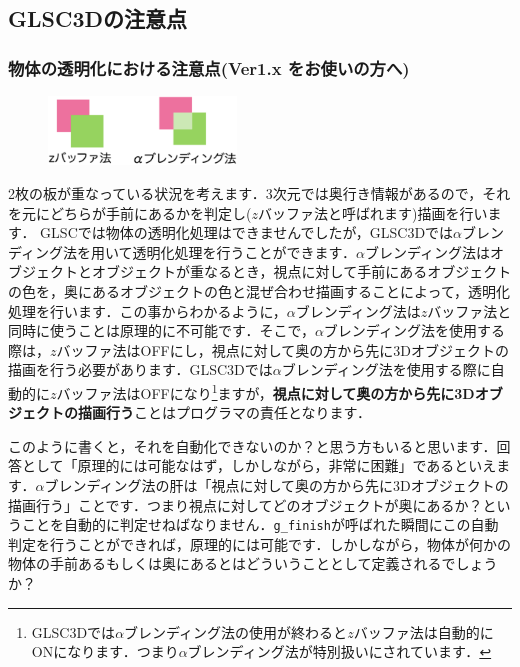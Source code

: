 \documentclass[platex,a4paper,12pt]{jsarticle}%
\begin{document}
\newpage
\subsection{GLSC3Dの注意点}

\subsubsection{物体の透明化における注意点(Ver1.x をお使いの方へ)}

\begin{figure}
\vspace{-1\baselineskip}
	\includegraphics[width=50mm]{004.eps}
\end{figure}

2枚の板が重なっている状況を考えます．3次元では奥行き情報があるので，それを元にどちらが手前にあるかを判定し($z$バッファ法と呼ばれます)描画を行います．
GLSCでは物体の透明化処理はできませんでしたが，GLSC3Dでは$\alpha$ブレンディング法を用いて透明化処理を行うことができます．$\alpha$ブレンディング法はオブジェクトとオブジェクトが重なるとき，視点に対して手前にあるオブジェクトの色を，奥にあるオブジェクトの色と混ぜ合わせ描画することによって，透明化処理を行います．この事からわかるように，$\alpha$ブレンディング法は$z$バッファ法と同時に使うことは原理的に不可能です．そこで，$\alpha$ブレンディング法を使用する際は，$z$バッファ法はOFFにし，視点に対して奥の方から先に3Dオブジェクトの描画を行う必要があります．GLSC3Dでは$\alpha$ブレンディング法を使用する際に自動的に$z$バッファ法はOFFになり\footnote{GLSC3Dでは$\alpha$ブレンディング法の使用が終わると$z$バッファ法は自動的にONになります．つまり$\alpha$ブレンディング法が特別扱いにされています．}ますが，{\bf 視点に対して奥の方から先に3Dオブジェクトの描画行う}ことはプログラマの責任となります．

このように書くと，それを自動化できないのか？と思う方もいると思います．回答として「原理的には可能なはず，しかしながら，非常に困難」であるといえます．$\alpha$ブレンディング法の肝は「視点に対して奥の方から先に3Dオブジェクトの描画行う」ことです．つまり視点に対してどのオブジェクトが奥にあるか？ということを自動的に判定せねばなりません．\verb|g_finish|が呼ばれた瞬間にこの自動判定を行うことができれば，原理的には可能です．しかしながら，物体が何かの物体の手前あるもしくは奥にあるとはどういうこととして定義されるでしょうか？
\end{document}
